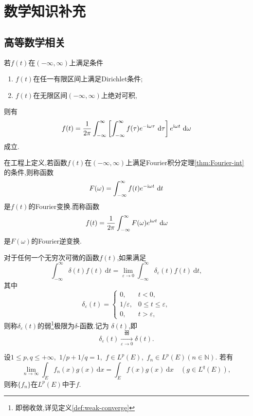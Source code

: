 \documentclass[cn,10pt,citestyle=gb7714-2015,bibstyle=gb7714-2015]{elegantbook}
\newcommand{\md}{\ \mathrm{d}}
\newcommand{\image}{\textup{i}}
\begin{document}
\appendix

\chapter{数学知识补充}
\section{高等数学相关}
\begin{theorem}\label{thm:Fourier-int}
  若$f(t)$在$(-\infty,\infty)$上满足条件
  \begin{enumerate}
    \item $f(t)$在任一有限区间上满足\textup{Dirichlet}条件;
    \item $f(t)$在无限区间$(-\infty,\infty)$上绝对可积,
  \end{enumerate}
  则有
  \begin{equation}
    f(t)=\frac{1}{2\pi}\int_{-\infty}^\infty\left[\int_{-\infty}^\infty f(\tau)e^{-\image\omega\tau}\md\tau\right]e^{\image\omega t}\md\omega
  \end{equation}
  成立.
\end{theorem}
\begin{definition}\label{def:Fourier-trans}
  在工程上定义,若函数$f(t)$在$(-\infty,\infty)$上满足\textup{Fourier}积分定理\ref{thm:Fourier-int}
  的条件,则称函数
  \begin{equation}
    F(\omega)=\int_{-\infty}^\infty f(t)e^{-\image\omega t}\md t
  \end{equation}
  是$f(t)$的\textup{Fourier}变换.而称函数
  \begin{equation}
    f(t)=\frac{1}{2\pi}\int_{-\infty}^\infty F(\omega)e^{\image\omega t}\md\omega
  \end{equation}
  是$F(\omega)$的\textup{Fourier}逆变换.
\end{definition}
\begin{definition}\label{def:DiracDelta}
  对于任何一个无穷次可微的函数$f(t)$,如果满足
  \[
    \int_{-\infty}^\infty\delta(t)f(t)\md t=\lim_{\varepsilon\to 0}\int_{-\infty}^\infty\delta_\varepsilon(t)f(t)\md t,
  \]
  其中
  \[
      \delta_\varepsilon(t)=\begin{cases}
        0,&t<0,\\
        1/\varepsilon,&0\leqslant t\leqslant\varepsilon,\\
        0,&t>\varepsilon,
      \end{cases}
  \]
  则称$\delta_\varepsilon(t)$的弱\footnote{即弱收敛,详见定义\ref{def:weak-converge}}极限为\colorbox{yellow!20}{$\delta$-函数}.记为
  $\delta(t)$,即
  \[
      \delta_\varepsilon(t)\xrightarrow[\varepsilon\to 0]{\text{弱}}\delta(t).
  \]
\end{definition}
\begin{definition}[弱收敛]\label{def:weak-converge}
  设$1\leqslant p,q\leqslant+\infty$,\ $1/p+1/q=1$,\ $f\in L^p(E)$,\ $f_n\in L^p(E)(n\in\mathbb{N})$.
  若有
  \begin{equation}
    \lim_{n\to\infty}\int_Ef_n(x)g(x)\md x=\int_Ef(x)g(x)\md x\quad (g\in L^q(E)),
  \end{equation}
  则称$\{f_n\}$在$L^p(E)$中于$f$.
\end{definition}
\end{document}
